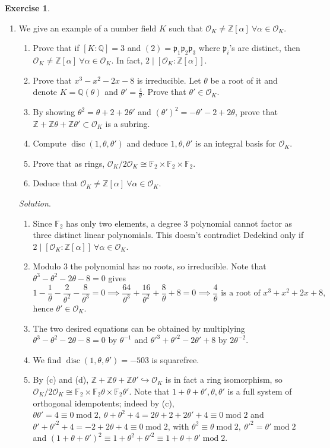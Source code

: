 \documentclass{article}
\newcommand{\Z}{\mathbb{Z}}
\newcommand{\Q}{\mathbb{Q}}
\newcommand{\F}{\mathbb{F}}
\newcommand{\Mod}{\operatorname{mod}}
\newcommand{\disc}{\operatorname{disc}}
\newcommand{\ri}{\mathcal{O}}
\newcommand{\ip}{\mathfrak{p}}
\theoremstyle{definition}
\newtheorem{exe}[defn]{Exercise}
\begin{document}
\begin{exe}
\begin{enumerate}
\item We give an example of a number field $K$ such that $\ri_K\neq\Z[\alpha]\ \forall\alpha\in\ri_K$.
\begin{enumerate}
\item Prove that if $[K:\Q]=3$ and $(2)=\ip_1\ip_2\ip_3$ where $\ip_i$'s are distinct, then $\ri_K\neq\Z[\alpha] \ \forall\alpha\in\ri_K$. In fact, $2\mid[\ri_K:\Z[\alpha]]$.
\item Prove that $x^3-x^2-2x-8$ is irreducible. Let $\theta$ be a root of it and denote $K=\Q(\theta)$ and $\theta'=\frac{4}{\theta}$. Prove that $\theta'\in\ri_K$.
\item By showing $\theta^2=\theta+2+2\theta'$ and $(\theta')^2=-\theta'-2+2\theta$, prove that $\Z+\Z\theta+\Z\theta'\subset\ri_K$ is a subring.
\item Compute $\disc(1,\theta,\theta')$ and deduce $1,\theta,\theta'$ is an integral basis for $\ri_K$.
\item Prove that as rings, $\ri_K/2\ri_K\cong\F_2\times\F_2\times\F_2$.
\item Deduce that $\ri_K\neq\Z[\alpha] \ \forall\alpha\in\ri_K$.
\end{enumerate}
\textit{Solution}. \begin{enumerate}
\item Since $\F_2$ has only two elements, a degree 3 polynomial cannot factor as three distinct linear polynomials. This doesn't contradict Dedekind only if $2\mid[\ri_K:\Z[\alpha]] \ \forall\alpha\in\ri_K$.
\item Modulo 3 the polynomial has no roots, so irreducible. Note that $\theta^3-\theta^2-2\theta-8=0$ gives
\[
1-\frac{1}{\theta}-\frac{2}{\theta^2}-\frac{8}{\theta^3}=0\implies \frac{64}{\theta^3}+\frac{16}{\theta^2}+\frac{8}{\theta}+8=0\implies \frac{4}{\theta}\text{ is a root of }x^3+x^2+2x+8,
\]
hence $\theta'\in\ri_K$.
\item The two desired equations can be obtained by multiplying $\theta^3-\theta^2-2\theta-8=0$ by $\theta^{-1}$ and $\theta'^3+\theta'^2-2\theta'+8$ by $2\theta^{-2}$.
\item We find $\disc(1,\theta,\theta')=-503$ is squarefree.
\item By (c) and (d), $\Z+\Z\theta+\Z\theta'\hookrightarrow\ri_K$ is in fact a ring isomorphism, so $\ri_K/2\ri_K\cong\F_2\times\F_2\theta\times\F_2\theta'$. Note that $1+\theta+\theta',\theta,\theta'$ is a full system of orthogonal idempotents; indeed by (c), $\theta\theta'=4\equiv 0\Mod 2,\ \theta+\theta^2+4=2\theta+2+2\theta'+4\equiv 0\Mod 2$ and $\theta'+\theta'^2+4=-2+2\theta+4\equiv 0\Mod 2$, with $\theta^2\equiv\theta\Mod 2,\ \theta'^2=\theta'\Mod 2$ and $(1+\theta+\theta')^2\equiv 1+\theta^2+\theta'^2\equiv 1+\theta+\theta'\Mod 2$.

\end{enumerate}
\end{enumerate}
\end{exe}
\end{document}
